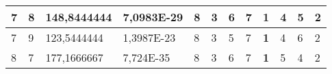 \documentclass[conference]{IEEEtran}
\begin{document}
\begin{table*}[]
\begin{tabular}{|llll|llllllll|}
\multicolumn{1}{|l|}{7}                                                              & \multicolumn{1}{l|}{8}                                                                 & \multicolumn{1}{l|}{148,8444444}                                                           & 7,0983E-29                              & \multicolumn{1}{l|}{8}                                                           & \multicolumn{1}{l|}{3}                                                           & \multicolumn{1}{l|}{6}                                                           & \multicolumn{1}{l|}{7}                                                           & \multicolumn{1}{l|}{\textbf{1}}                                                  & \multicolumn{1}{l|}{4}                                                           & \multicolumn{1}{l|}{5}                                                           & 2                                   \\ \hline
\multicolumn{1}{|l|}{7}                                                              & \multicolumn{1}{l|}{9}                                                                 & \multicolumn{1}{l|}{123,5444444}                                                           & 1,3987E-23                              & \multicolumn{1}{l|}{8}                                                           & \multicolumn{1}{l|}{3}                                                           & \multicolumn{1}{l|}{5}                                                           & \multicolumn{1}{l|}{7}                                                           & \multicolumn{1}{l|}{\textbf{1}}                                                  & \multicolumn{1}{l|}{4}                                                           & \multicolumn{1}{l|}{6}                                                           & 2                                   \\ \hline
\multicolumn{1}{|l|}{8}                                                              & \multicolumn{1}{l|}{7}                                                                 & \multicolumn{1}{l|}{177,1666667}                                                           & 7,724E-35                               & \multicolumn{1}{l|}{8}                                                           & \multicolumn{1}{l|}{3}                                                           & \multicolumn{1}{l|}{6}                                                           & \multicolumn{1}{l|}{7}                                                           & \multicolumn{1}{l|}{\textbf{1}}                                                  & \multicolumn{1}{l|}{5}                                                           & \multicolumn{1}{l|}{4}                                                           & 2                                   \\ \hline

\end{tabular}
\end{table*}
\end{document}
